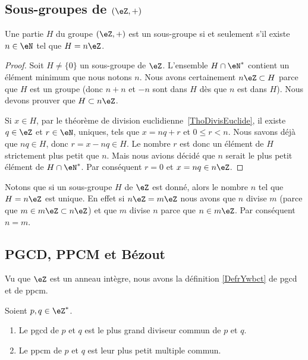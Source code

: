 \subsection{Sous-groupes de \texorpdfstring{$(\eZ,+)$}{(Z,+)}}

\begin{proposition} \label{PropSsgpZestnZ}
    Une partie \( H\) du groupe \( (\eZ,+)\) est un sous-groupe si et seulement s'il existe \( n\in\eN\) tel que \( H=n\eZ\).
\end{proposition}

\begin{proof}
    Soit \( H\neq\{ 0 \}\) un sous-groupe de \( \eZ\). L'ensemble \( H\cap\eN^*\) contient un élément minimum que nous notons \( n\). Nous avons certainement \( n\eZ\subset H\) parce que \( H\) est un groupe (donc \( n+n\) et \( -n\) sont dans \( H\) dès que \( n\) est dans \( H\)). Nous devons prouver que \( H\subset n\eZ\).

    Si \( x\in H\), par le théorème de division euclidienne~\ref{ThoDivisEuclide}, il existe \( q\in\eZ\) et \( r\in\eN \), uniques, tels que \( x=nq+r\) et \(0 \leq r < n \). Nous savons déjà que \( nq\in H\), donc \( r = x - nq \in H \). Le nombre \( r\) est donc un élément de \( H\) strictement plus petit que \( n\). Mais nous avions décidé que \( n\) serait le plus petit élément de \( H\cap\eN^*\). Par conséquent \( r=0\) et \( x=nq\in n\eZ\).
\end{proof}


Notons que si un sous-groupe \( H\) de \( \eZ\) est donné, alors le nombre \( n\) tel que \( H=n\eZ\) est unique. En effet si \( n\eZ=m\eZ\) nous avons que \( n\) divise \( m\) (parce que \( m\in m\eZ\subset n\eZ\)) et que \( m\) divise \( n\) parce que \( n\in m\eZ\). Par conséquent \( n=m\).


\subsection{PGCD, PPCM et Bézout}

Vu que \( \eZ\) est un anneau intègre, nous avons la définition \ref{DefrYwbct} de pgcd et de ppcm.
\begin{proposition}       \label{PROPooAVRGooUfhjwF}
    Soient \( p,q\in\eZ^*\). 
    \begin{enumerate}
        \item
            Le pgcd de \( p\) et \( q\) est le plus grand diviseur commun de \( p\) et \( q\). 
        \item
            Le ppcm de \( p\) et \( q\) est leur plus petit multiple commun.
    \end{enumerate}
\end{proposition}

